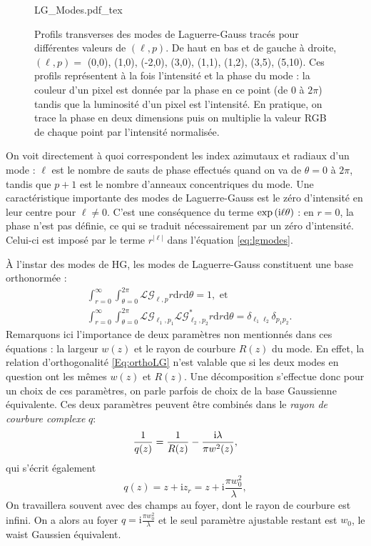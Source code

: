 \begin{figure}[!ht]
\centering
\def\svgwidth{\columnwidth}
{LG_Modes.pdf_tex}
\caption{Profils transverses des modes de Laguerre-Gauss tracés pour différentes valeurs de $(\ell,p)$. De haut en bas et de gauche à droite, $(\ell,p) =$ (0,0), (1,0), (-2,0), (3,0), (1,1), (1,2), (3,5), (5,10). Ces profils représentent à la fois l'intensité et la phase du mode : la couleur d'un pixel est donnée par la phase en ce point (de 0 à $2\pi$) tandis que la luminosité d'un pixel est l'intensité. En pratique, on trace la phase en deux dimensions puis on multiplie la valeur RGB de chaque point par l'intensité normalisée.}
\label{Fig:LGModes}
\end{figure}

On voit directement à quoi correspondent les index azimutaux et radiaux d'un mode : $\ell$ est le nombre de sauts de phase effectués quand on va de $\theta = 0$ à $2\pi$, tandis que $p+1$ est le nombre d'anneaux concentriques du mode.  Une caractéristique importante des modes de Laguerre-Gauss est le zéro d'intensité en leur centre pour $\ell \neq 0$. C'est une conséquence du terme $\exp{({\mathrm{i}}\ell \theta )}$ : en $r=0$, la phase n'est pas définie, ce qui se traduit nécessairement par un zéro d'intensité. Celui-ci est imposé par le terme $r^{|\ell|}$ dans l'équation \ref{eq:lgmodes}.

\`A l'instar des modes de HG, les modes de Laguerre-Gauss constituent une base orthonormée : 
\begin{align}
&\int_{r=0}^{\infty}\int_{\theta=0}^{2\pi}{\mathcal{LG}_{\ell,p} r\mathrm{d}r\mathrm{d}\theta} = 1, \mbox{ et}\nonumber\\ 
&\int_{r=0}^{\infty}\int_{\theta=0}^{2\pi}{\mathcal{LG}_{\ell_1,p_1} \mathcal{LG}^{*}_{\ell_2,p_2} r\mathrm{d}r\mathrm{d}\theta} = \delta_{\ell_1\ell_2}\delta_{p_1p_2}.
\label{Eq:orthoLG}
\end{align}
Remarquons ici l'importance de deux paramètres non mentionnés dans ces équations : la largeur $w(z)$ et le rayon de courbure $R(z)$ du mode. En effet, la relation d'orthogonalité \ref{Eq:orthoLG} n'est valable que si les deux modes en question ont les mêmes $w(z)$ et $R(z)$. Une décomposition s'effectue donc pour un choix de ces paramètres, on parle parfois de choix de la base Gaussienne équivalente. Ces deux paramètres peuvent être combinés dans le \textit{rayon de courbure complexe} $q$:
\begin{equation}
\frac{1}{q(z)} = \frac{1}{R(z)}-\frac{\mathrm{i}\lambda}{\pi w^2(z)},
\end{equation}
qui s'écrit également 
\begin{equation}
q(z) = z + \mathrm{i}z_r = z + \mathrm{i}\frac{\pi w_0^2}{\lambda},
\end{equation}
On travaillera souvent avec des champs au foyer, dont le rayon de courbure est infini. On a alors au foyer $q = \mathrm{i}\frac{\pi w_0^2}{\lambda}$ et le seul paramètre ajustable restant est $w_0$, le waist Gaussien équivalent.

